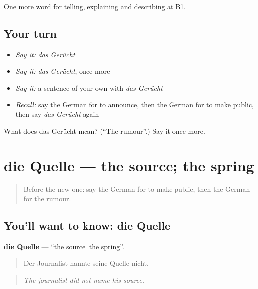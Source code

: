 \begin{grammarlens}[title={What you've built}]
One more word for telling, explaining and describing at B1.
\end{grammarlens}

\subsection*{Your turn}
\begin{itemize}
\raggedright
  \item \emph{Say it:} \emph{das Gerücht}
  \item \emph{Say it:} \emph{das Gerücht}, once more
  \item \emph{Say it:} a sentence of your own with \emph{das Gerücht}
  \item \emph{Recall:} say the German for to announce, then the German for to make public, then say \emph{das Gerücht} again
\end{itemize}

\begin{tcolorbox}[breakable,colback=teal!4,colframe=teal!35!black,title={Before you move on}]
What does das Gerücht mean? (\textquotedblleft{}The rumour\textquotedblright{}.) Say it once more.
\end{tcolorbox}
\section[die Quelle]{die Quelle — the source; the spring}

\label{lesson:GE-C274-quelle}



\begin{quote}
Before the new one: say the German for to make public, then the German for the rumour.
\end{quote}

\subsection*{You'll want to know: die Quelle}
\textbf{die Quelle} — \textquotedblleft{}the source; the spring\textquotedblright{}.

\begin{quote}
Der Journalist nannte seine Quelle nicht.
\end{quote}

\begin{quote}
\emph{The journalist did not name his source.}
\end{quote}

